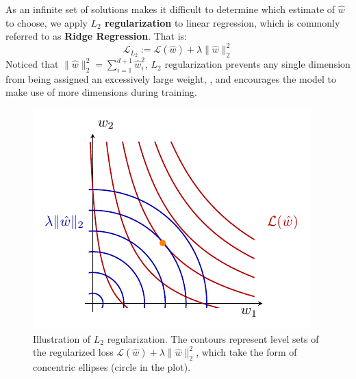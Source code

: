 \documentclass[../main]{subfiles}
\begin{document}
As an infinite set of solutions makes it difficult to determine which estimate of $\hat w$ to choose, we apply \textbf{$L_2$ regularization} to linear regression, which is commonly referred to as \textbf{Ridge Regression}. That is:
\begin{equation}
    \mathcal L_{L_2}:=\mathcal L(\hat w)+\boxed{\lambda\|\hat w\|_2^2}
\end{equation}
Noticed that $\|\hat w\|_2^2=\sum_{i=1}^{d+1}\hat w_i^2$, $L_2$ regularization prevents any single dimension from being assigned an excessively large weight, , and encourages the model to make use of more dimensions during training.
\begin{figure}[H]
  \centering
  \includegraphics{../../tikz/1/2-2.pdf}
  \caption{Illustration of $L_2$ regularization. 
The contours represent level sets of the regularized loss $\mathcal{L}(\hat w) + \lambda \|\hat w\|_2^2$, 
which take the form of concentric ellipses (circle in the plot). }
\end{figure}
\end{document}

